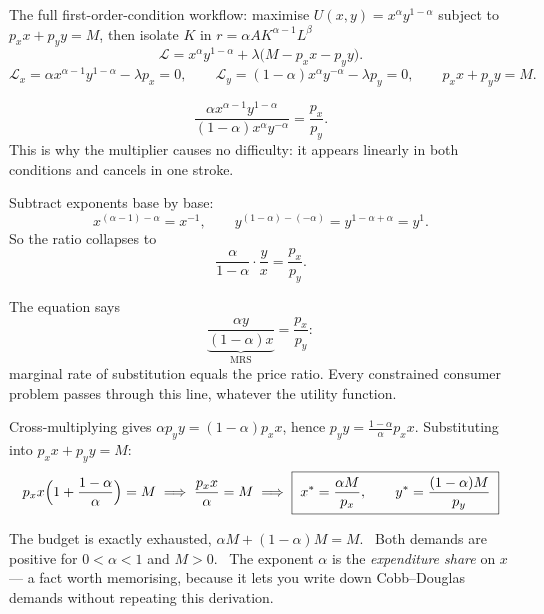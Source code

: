 \begin{worked}{The full first-order-condition workflow: maximise $U(x,y)=x^{\alpha}y^{1-\alpha}$ subject to $p_{x}x+p_{y}y=M$, then isolate $K$ in $r=\alpha AK^{\alpha-1}L^{\beta}$}
\[
  \mathcal{L}=x^{\alpha}y^{1-\alpha}+\lambda\bigl(M-p_{x}x-p_{y}y\bigr).
\]
\[
  \mathcal{L}_{x}=\alpha x^{\alpha-1}y^{1-\alpha}-\lambda p_{x}=0,\qquad
  \mathcal{L}_{y}=(1-\alpha)x^{\alpha}y^{-\alpha}-\lambda p_{y}=0,\qquad
  p_{x}x+p_{y}y=M .
\]

\[
  \frac{\alpha x^{\alpha-1}y^{1-\alpha}}{(1-\alpha)x^{\alpha}y^{-\alpha}}
  =\frac{p_{x}}{p_{y}} .
\]
This is why the multiplier causes no difficulty: it appears linearly in
both conditions and cancels in one stroke.

Subtract exponents base by base:
\[
  x^{(\alpha-1)-\alpha}=x^{-1},\qquad
  y^{(1-\alpha)-(-\alpha)}=y^{1-\alpha+\alpha}=y^{1} .
\]
So the ratio collapses to
\[
  \frac{\alpha}{1-\alpha}\cdot\frac{y}{x}=\frac{p_{x}}{p_{y}} .
\]

The equation says
\[
  \underbrace{\frac{\alpha y}{(1-\alpha)x}}_{\text{MRS}}=\frac{p_{x}}{p_{y}} :
\]
marginal rate of substitution equals the price ratio. Every constrained
consumer problem passes through this line, whatever the utility function.

Cross-multiplying gives $\alpha p_{y}y=(1-\alpha)p_{x}x$, hence
$p_{y}y=\frac{1-\alpha}{\alpha}p_{x}x$. Substituting into
$p_{x}x+p_{y}y=M$:
\[
  p_{x}x\Bigl(1+\frac{1-\alpha}{\alpha}\Bigr)=M
  \;\Longrightarrow\;
  \frac{p_{x}x}{\alpha}=M
  \;\Longrightarrow\;
  \boxed{\;x^{*}=\frac{\alpha M}{p_{x}},\qquad y^{*}=\frac{(1-\alpha)M}{p_{y}}\;}
\]

The budget is exactly exhausted, $\alpha M+(1-\alpha)M=M$. \checkmark\ Both
demands are positive for $0<\alpha<1$ and $M>0$. \checkmark\ The exponent
$\alpha$ is the \emph{expenditure share} on $x$ --- a fact worth memorising,
because it lets you write down Cobb--Douglas demands without repeating this
derivation.


\end{worked}
